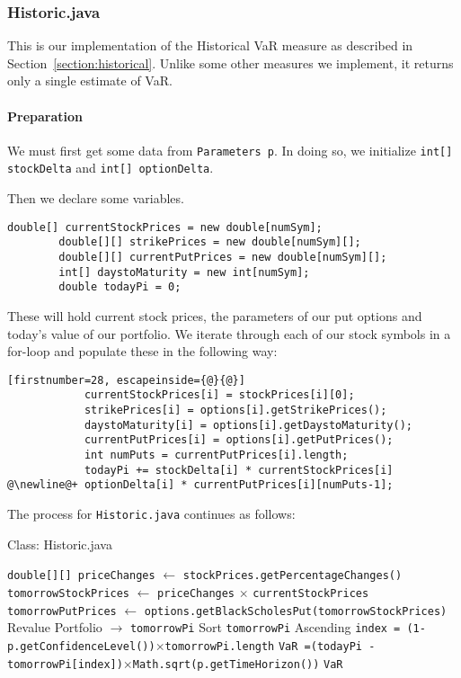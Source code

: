 \documentclass[../Dissertation.tex]{subfiles}
\begin{document}
\subsubsection{Historic.java}
\label{section:javahistoric}
This is our implementation of the Historical VaR measure as described in Section~\ref{section:historical}.
Unlike some other measures we implement, it returns only a single estimate of VaR.

\paragraph{Preparation}

We must first get some data from \lstinline|Parameters p|.
In doing so, we initialize \lstinline|int[] stockDelta| and \lstinline|int[] optionDelta|.

Then we declare some variables.
\begin{lstlisting}[firstnumber=21]
        double[] currentStockPrices = new double[numSym];
        double[][] strikePrices = new double[numSym][];
        double[][] currentPutPrices = new double[numSym][];
        int[] daystoMaturity = new int[numSym];
        double todayPi = 0;
\end{lstlisting}
These will hold current stock prices, the parameters of our put options and today's value of our portfolio.
We iterate through each of our stock symbols in a for-loop and populate these in the following way:
\begin{lstlisting}[firstnumber=28, escapeinside={@}{@}]
            currentStockPrices[i] = stockPrices[i][0];
            strikePrices[i] = options[i].getStrikePrices();
            daystoMaturity[i] = options[i].getDaystoMaturity();
            currentPutPrices[i] = options[i].getPutPrices();
            int numPuts = currentPutPrices[i].length;
            todayPi += stockDelta[i] * currentStockPrices[i] @\newline@+ optionDelta[i] * currentPutPrices[i][numPuts-1];
\end{lstlisting}

The process for \lstinline|Historic.java| continues as follows:
					\begin{algorithm}[H]
						\caption{Class: Historic.java}
						\begin{algorithmic}[1]
						\label{class:Historic}									
						\State \lstinline|double[][] priceChanges| $\gets$ \lstinline|stockPrices.getPercentageChanges()|
						\State \lstinline|tomorrowStockPrices| $\gets$ \lstinline|priceChanges| $\times$ \lstinline|currentStockPrices|
						\State \lstinline|tomorrowPutPrices| $\gets$ \lstinline|options.getBlackScholesPut(tomorrowStockPrices)|
						\State Revalue Portfolio $\to$ \lstinline|tomorrowPi|
						\State Sort \lstinline|tomorrowPi| Ascending
						\State \lstinline|index = (1-p.getConfidenceLevel())|$\times$\lstinline|tomorrowPi.length|
						\State \lstinline|VaR =(todayPi - tomorrowPi[index])|$\times$\lstinline|Math.sqrt(p.getTimeHorizon())|
						\State \Return \lstinline|VaR|
						\EndFunction
						\end{algorithmic}
					\end{algorithm}
\iffalse
\end{document}
